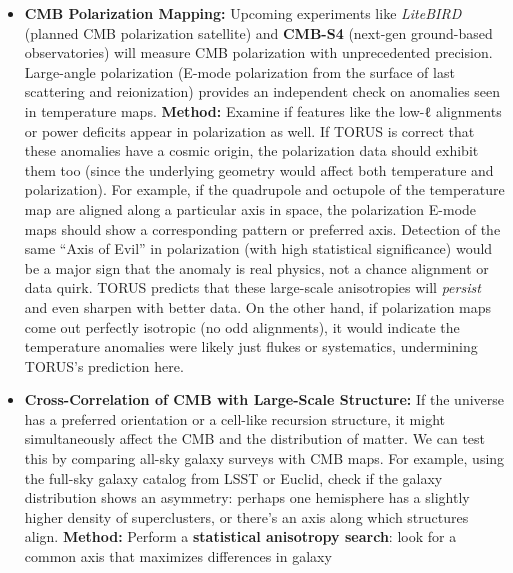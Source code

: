 \documentclass[
]{article}
\begin{document}
\begin{itemize}
  \begin{itemize}
  \item
    \textbf{CMB Polarization Mapping:} Upcoming experiments like
    \emph{LiteBIRD} (planned CMB polarization satellite) and
    \textbf{CMB-S4} (next-gen ground-based observatories) will measure
    CMB polarization with unprecedented precision. Large-angle
    polarization (E-mode polarization from the surface of last
    scattering and reionization) provides an independent check on
    anomalies seen in temperature maps\hspace{0pt}. \textbf{Method:}
    Examine if features like the low-ℓ alignments or power deficits
    appear in polarization as well. If TORUS is correct that these
    anomalies have a cosmic origin, the polarization data should exhibit
    them too (since the underlying geometry would affect both
    temperature and polarization). For example, if the quadrupole and
    octupole of the temperature map are aligned along a particular axis
    in space, the polarization E-mode maps should show a corresponding
    pattern or preferred axis\hspace{0pt}. Detection of the same ``Axis
    of Evil'' in polarization (with high statistical significance) would
    be a major sign that the anomaly is real physics, not a chance
    alignment or data quirk\hspace{0pt}. TORUS predicts that these
    large-scale anisotropies will \emph{persist} and even sharpen with
    better data\hspace{0pt}. On the other hand, if polarization maps
    come out perfectly isotropic (no odd alignments), it would indicate
    the temperature anomalies were likely just flukes or systematics,
    undermining TORUS's prediction here\hspace{0pt}.
  \item
    \textbf{Cross-Correlation of CMB with Large-Scale Structure:} If the
    universe has a preferred orientation or a cell-like recursion
    structure, it might simultaneously affect the CMB and the
    distribution of matter. We can test this by comparing all-sky galaxy
    surveys with CMB maps\hspace{0pt}. For example, using the full-sky
    galaxy catalog from LSST or Euclid, check if the galaxy distribution
    shows an asymmetry: perhaps one hemisphere has a slightly higher
    density of superclusters, or there's an axis along which structures
    align. \textbf{Method:} Perform a \textbf{statistical anisotropy
    search}: look for a common axis that maximizes differences in galaxy

\end{itemize}
\end{itemize}
\end{document}
